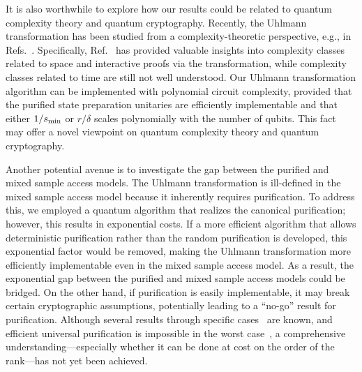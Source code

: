 It is also worthwhile to explore how our results could be related to quantum complexity theory and quantum cryptography.
Recently, the Uhlmann transformation has been studied from a complexity-theoretic perspective, e.g., in Refs.~\cite{metger2023stateqipspace, bostanci2023unicompuhlmann, chia2024complexitytheoryquantumpromise}. 
Specifically, Ref.~\cite{metger2023stateqipspace} has provided valuable insights into complexity classes related to space and interactive proofs via the transformation, while complexity classes related to time are still not well understood.
Our Uhlmann transformation algorithm can be implemented with polynomial circuit complexity, provided that the purified state preparation unitaries are efficiently implementable and that either $1/s_{\rm min}$ or $r/\delta$ scales polynomially with the number of qubits.
This fact may offer a novel viewpoint on quantum complexity theory and quantum cryptography.


Another potential avenue is to investigate the gap between the purified and mixed sample access models.
The Uhlmann transformation is ill-defined in the mixed sample access model because it inherently requires purification.
To address this, we employed a quantum algorithm that realizes the canonical purification; however, this results in exponential costs. 
If a more efficient algorithm that allows deterministic purification rather than the random purification is developed, this exponential factor would be removed, making the Uhlmann transformation more efficiently implementable even in the mixed sample access model.
As a result, the exponential gap between the purified and mixed sample access models could be bridged.
On the other hand, if purification is easily implementable, it may break certain cryptographic assumptions, potentially leading to a ``no-go'' result for purification.
Although several results through specific cases~\cite{Chen2021ValiationalTraceFidelity, Ezzell2023MixedCompil, liu2024exponentialseparations, chen2024localtestUniInv, Sala2024SpontaneousPurif, weinstein2024efficientdetectionstrongtoweakspontaneous} are known, and efficient universal purification is impossible in the worst case~\cite{liu2025universalpurification}, a comprehensive understanding---especially whether it can be done at cost on the order of the rank---has not yet been achieved.



